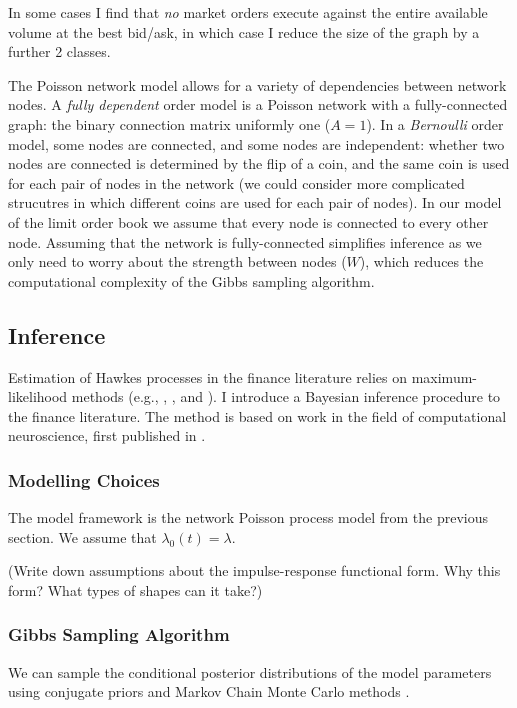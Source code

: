 In some cases I find that \textit{no} market orders execute against the entire available volume at the best bid/ask, in which case I reduce the size of the graph by a further 2 classes.

The Poisson network model allows for a variety of dependencies between network nodes. A \textit{fully dependent} order model is a Poisson network with a fully-connected graph: the binary connection matrix uniformly one ($A = 1$). In a \textit{Bernoulli} order model, some nodes are connected, and some nodes are independent: whether two nodes are connected is determined by the flip of a coin, and the same coin is used for each pair of nodes in the network (we could consider more complicated strucutres in which different coins are used for each pair of nodes). In our model of the limit order book we assume that every node is connected to every other node. Assuming that the network is fully-connected simplifies inference as we only need to worry about the strength between nodes ($W$), which reduces the computational complexity of the Gibbs sampling algorithm.


\subsection{Inference}
Estimation of Hawkes processes in the finance literature relies on maximum-likelihood methods (e.g., \cite{Bowsher2007}, \cite{Large2007}, and \cite{Bacry2013}). I introduce a Bayesian inference procedure to the finance literature. The method is based on work in the field of computational neuroscience, first published in \cite{Linderman2015}.

\subsubsection{Modelling Choices}
The model framework is the network Poisson process model from the previous section. We assume that $\lambda_0(t) = \lambda$.

(Write down assumptions about the impulse-response functional form. Why this form? What types of shapes can it take?)

\subsubsection{Gibbs Sampling Algorithm}
We can sample the conditional posterior distributions of the model parameters using conjugate priors and Markov Chain Monte Carlo methods \cite{}.

